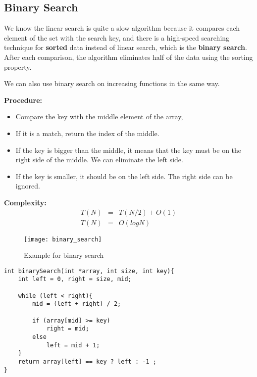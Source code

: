 \documentclass[12pt]{article}
\begin{document}
		\subsection{Binary Search}
			
We know the linear search is quite a slow algorithm because it compares each element of the set with the search key, and there is a high-speed searching technique for \textbf{sorted} data instead of linear search, which is the \textbf{binary search}. After each comparison, the algorithm eliminates half of the data using the sorting property. 

We can also use binary search on increasing functions in the same way. 

\textbf{Procedure: }
\begin{itemize}
	\item Compare the key with the middle element of the array,
	\item If it is a match, return the index of the middle.
	\item If the key is bigger than the middle, it means that the key must be on the right side of the middle. We can eliminate the left side.
	\item If the key is smaller, it should be on the left side. The right side can be ignored.
\end{itemize}	

\textbf{Complexity: }
\begin{eqnarray*}
T(N) &=& T(N / 2) + O(1) \\
T(N) &=& O(logN)
\end{eqnarray*}


\begin{figure}[h]
	\centering
	\texttt{[image: binary\_search]}
	\caption{Example for binary search}
	\label{fig:binary_search}
\end{figure}

\cleardoublepage

\begin{verbatim}
int binarySearch(int *array, int size, int key){
    int left = 0, right = size, mid;

    while (left < right){
        mid = (left + right) / 2;

        if (array[mid] >= key)
            right = mid;
        else
            left = mid + 1;
    }
    return array[left] == key ? left : -1 ;
}
\end{verbatim}

				\cleardoublepage
\end{document}
